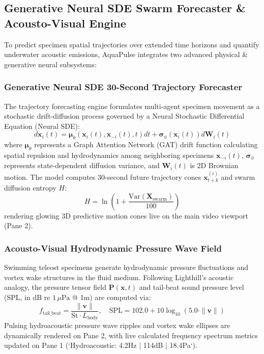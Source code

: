 \documentclass[11pt,a4paper]{article}
\begin{document}
\subsection{Generative Neural SDE Swarm Forecaster \& Acousto-Visual Engine}
To predict specimen spatial trajectories over extended time horizons and quantify underwater acoustic emissions, AquaPulse integrates two advanced physical & generative neural subsystems:

\subsubsection{Generative Neural SDE 30-Second Trajectory Forecaster}
The trajectory forecasting engine formulates multi-agent specimen movement as a stochastic drift-diffusion process governed by a Neural Stochastic Differential Equation (Neural SDE):
\begin{equation}
d\mathbf{x}_i(t) = \boldsymbol{\mu}_{\theta}\left(\mathbf{x}_i(t), \mathbf{x}_{-i}(t), t\right) dt + \boldsymbol{\sigma}_{\phi}\left(\mathbf{x}_i(t)\right) d\mathbf{W}_i(t)
\end{equation}
where $\boldsymbol{\mu}_{\theta}$ represents a Graph Attention Network (GAT) drift function calculating spatial repulsion and hydrodynamics among neighboring specimens $\mathbf{x}_{-i}(t)$, $\boldsymbol{\sigma}_{\phi}$ represents state-dependent diffusion variance, and $\mathbf{W}_i(t)$ is 2D Brownian motion. The model computes 30-second future trajectory cones $\mathbf{x}_{t+k}^{(i)}$ and swarm diffusion entropy $H$:
\begin{equation}
H = \ln\left(1 + \frac{\text{Var}(\mathbf{X}_{\text{swarm}})}{100}\right)
\end{equation}
rendering glowing 3D predictive motion cones live on the main video viewport (Pane 2).

\subsubsection{Acousto-Visual Hydrodynamic Pressure Wave Field}
Swimming teleost specimens generate hydrodynamic pressure fluctuations and vortex wake structures in the fluid medium. Following Lighthill's acoustic analogy, the pressure tensor field $\mathbf{P}(\mathbf{x}, t)$ and tail-beat sound pressure level (SPL, in $\text{dB re } 1\,\mu\text{Pa}$ @ 1m) are computed via:
\begin{equation}
f_{\text{tail\_beat}} = \frac{\|\mathbf{v}\|}{\text{St} \cdot L_{\text{body}}}, \quad \text{SPL} = 102.0 + 10 \log_{10}\left(5.0 \cdot \|\mathbf{v}\|\right)
\end{equation}
Pulsing hydroacoustic pressure wave ripples and vortex wake ellipses are dynamically rendered on Pane 2, with live calculated frequency spectrum metrics updated on Pane 1 (`Hydroacoustic: 4.2Hz | 114dB | 18.4Pa`).
\end{document}
